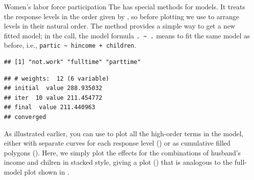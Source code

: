 \documentclass[11pt]{book}
\renewenvironment{knitrout}{\small\renewcommand{\baselinestretch}{.85}}{} %
\begin{document}
\begin{Example}[wlfpart2]{Women's labor force participation}
The  has special methods for  models.
It treats the response levels in the order given by , so before plotting
we use  to arrange levels in their natural order.  The
 method provides a simple way to get a new fitted model;
in the call, the model formula \verb|. ~ .| means to fit the same model as before,
i.e., \verb|partic ~ hincome + children|.
\begin{knitrout}
\color{fgcolor}\begin{kframe}
\begin{alltt}
\hlopt{$}
\end{alltt}
\begin{verbatim}
## [1] "not.work" "fulltime" "parttime"
\end{verbatim}
\begin{alltt}
\hlopt{$} \hlkwb{<-} \hlopt{$}
                          \hlstd{=}\hlstd{(}\hlstd{,} \hlstd{,} \hlstd{))}
 \hlkwb{<-}  \hlopt{~} 
\end{alltt}
\begin{verbatim}
## # weights:  12 (6 variable)
## initial  value 288.935032 
## iter  10 value 211.454772
## final  value 211.440963 
## converged
\end{verbatim}
\end{kframe}
\end{knitrout}

As illustrated earlier, you can use  to plot
all the high-order terms in the model, either with separate curves for each response level
() or as cumulative filled polygons ().
Here, we simply plot the effects for the combinations of husband's income and
chilren in stacked style, giving a plot ()
that is analogous to the full-model plot shown in .
\begin{knitrout}
\color{fgcolor}\begin{kframe}
\begin{alltt}
\hlstd{(}\hlstd{(}\hlstd{(}\hlstd{,} 
     \hlstd{=}\hlstd{,} \hlstd{=}\hlstd{(}\hlstd{=}\hlstd{,} \hlstd{=}\hlstd{))}
\end{alltt}
\end{kframe}\begin{figure}[!htbp]



\end{figure}
\end{knitrout}
\end{Example}
\end{document}
